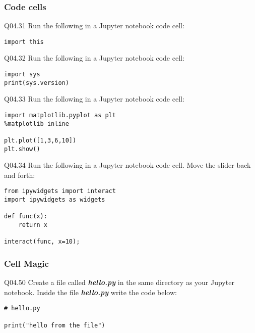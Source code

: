 \documentclass{book}
\newenvironment{problems}{}{}  %
\begin{document}
    
        \begin{problems}
        \hypertarget{code-cells}{%
\subsubsection{Code cells}\label{code-cells}}

Q04.31 Run the following in a Jupyter notebook code cell:

\begin{lstlisting}
import this
\end{lstlisting}

Q04.32 Run the following in a Jupyter notebook code cell:

\begin{lstlisting}
import sys
print(sys.version)
\end{lstlisting}

Q04.33 Run the following in a Jupyter notebook code cell:

\begin{lstlisting}
import matplotlib.pyplot as plt
%matplotlib inline

plt.plot([1,3,6,10])
plt.show()
\end{lstlisting}

Q04.34 Run the following in a Jupyter notebook code cell. Move the
slider back and forth:

\begin{lstlisting}
from ipywidgets import interact
import ipywidgets as widgets

def func(x):
    return x
    
interact(func, x=10);
\end{lstlisting}
        \end{problems}

    




    
        \hypertarget{cell-magic}{%
\subsubsection{Cell Magic}\label{cell-magic}}

Q04.50 Create a file called \textbf{\emph{hello.py}} in the same
directory as your Jupyter notebook. Inside the file
\textbf{\emph{hello.py}} write the code below:

\begin{lstlisting}
# hello.py

print("hello from the file")
\end{lstlisting}
\end{document}
